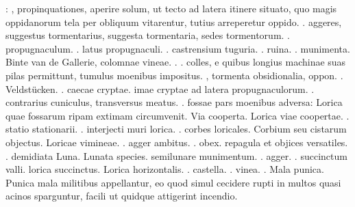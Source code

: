 %
\pend
\vspace*{0.5em}%
\pstart%
: , propinquationes, aperire solum, ut tecto ad latera itinere
situato, quo magis oppidanorum tela per obliquum vitarentur, tutius arreperetur oppido.
\pend%
\pstart%
. aggeres, suggestus tormentarius, suggesta tormentaria, sedes tormentorum.
\pend%
\pstart%
. propugnaculum.
\pend%
\pstart%
. latus propugnaculi.
\pend%
\pstart%
. castrensium tuguria.
\pend%
\pstart%
. ruina.
\pend%
\pstart%
. munimenta.
\pend%
\pstart%
 Binte van de Gallerie, colomnae vineae.
\pend%
\pstart%
. . colles, e quibus longius machinae suas pilas permittunt, tumulus moenibus impositus.
\pend%
\pstart%
, tormenta obsidionalia, oppon. . Veld\-st\"{u}cken.
\pend%
\pstart%
. caecae cryptae. imae cryptae ad latera propugnaculorum.
\pend%
\pstart%
. contrarius cuniculus, transversus meatus.
\pend%
\pstart%
. fossae pars moenibus adversa: Lorica quae fossarum ripam ex\-timam circumvenit. Via cooperta. Lorica viae coopertae.
\pend%
\pstart%
. statio stationarii.
\pend%
\pstart%
. interjecti muri lorica.
\pend%
\pstart%
. corbes loricales. Corbium seu cistarum objectus. Loricae vimineae.
\pend%
\pstart%
. agger ambitus.
\pend%
\pstart%
. obex. repagula et objices versatiles.
\pend%
\pstart%
. demidiata Luna. Lunata species. semilunare munimentum.
\pend%
\pstart%
. agger.
\pend%
\pstart%
. succinctum valli. lorica succinctus. Lorica horizontalis.
\pend%
\pstart%
. castella.
\pend%
\pstart%
. vinea.
\pend%
\pstart%
. Mala punica. Punica mala militibus appellantur, eo quod simul cecidere rupti in multos quasi acinos sparguntur, facili ut quidque attigerint incendio.
\pend%
\pstart%
